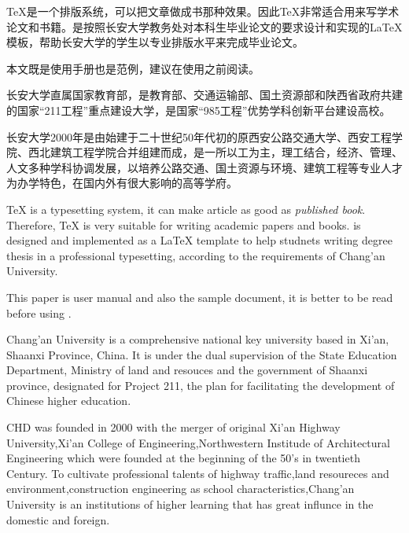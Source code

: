 \begin{cabstract}
\TeX{}是一个排版系统，可以把文章做成书那种效果。因此\TeX{}非常适合用来写学术论文和书籍。\chdpaper{}是按照长安大学教务处对本科生毕业论文的要求设计和实现的\LaTeX{}模板，帮助长安大学的学生以专业排版水平来完成毕业论文。

本文既是\chdpaper{}使用手册也是范例，建议在使用\chdpaper{}之前阅读。

长安大学直属国家教育部，是教育部、交通运输部、国土资源部和陕西省政府共建的国家“211工程”重点建设大学，是国家“985工程”优势学科创新平台建设高校。

长安大学2000年是由始建于二十世纪50年代初的原西安公路交通大学、西安工程学院、西北建筑工程学院合并组建而成，是一所以工为主，理工结合，经济、管理、人文多种学科协调发展，以培养公路交通、国土资源与环境、建筑工程等专业人才为办学特色，在国内外有很大影响的高等学府。
\end{cabstract}
\newpage
\begin{eabstract}
\TeX{} is a typesetting system, it can make article as good as {\em published book}. Therefore, \TeX{} is very suitable for writing academic papers and books. \chdpaper{}is designed and implemented as a \LaTeX{} template to help studnets writing degree thesis in a professional typesetting, according to the requirements of Chang'an University.

This paper is \chdpaper{}user manual and also the sample document, it is better to be read before using \chdpaper{}.

Chang'an  University is a comprehensive national key university based in Xi'an, %
Shaanxi Province, China. It is under the dual supervision of the State Education Department, Ministry of land and resouces and the government of Shaanxi province, designated for Project 211, %
the plan for facilitating the development of Chinese higher education. %

CHD was founded in 2000 with the merger of original Xi'an Highway University,Xi'an College of Engineering,Northwestern Institude of Architectural Engineering which were founded at the beginning of the 50's in twentieth Century. %
To cultivate professional talents of highway traffic,land resoureces and environment,construction engineering as school characteristics,Chang'an  University is an institutions of higher learning that has great influnce in the domestic and foreign.
\end{eabstract}
\newpage